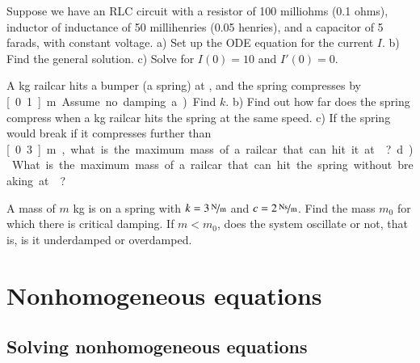 \begin{exercise}
Suppose we have an RLC circuit with a resistor of 100 milliohms (0.1 ohms),
inductor of inductance of 50 millihenries (0.05 henries), and a capacitor of 5 farads, with
constant voltage.  a) Set up the ODE equation for the current $I$. b) Find
the general solution.  c) Solve for $I(0) = 10$ and $I'(0) = 0$.
\end{exercise}

\begin{exercise}
A \unit[5000]{kg} railcar hits a bumper (a spring) at ,
and the spring compresses by \unit[0.1]{m}.  Assume no damping.
a) Find $k$. b) Find out how far does the spring compress when a
\unit[10000]{kg} railcar hits the spring at the same speed. c) If the spring
would break if it compresses further than \unit[0.3]{m}, what is the maximum
mass of a railcar that can hit it at ? d) What is
the maximum mass of a railcar that can hit the spring without breaking
at ?
\end{exercise}

\begin{exercise}
A mass of $m$ \unit{kg} is on a spring with $k=\unitfrac[3]{N}{m}$ and
$c=\unitfrac[2]{Ns}{m}$.  Find the mass $m_0$ for which there is critical
damping.  If $m < m_0$, does the system oscillate or not, that is, is it
underdamped or overdamped.
\end{exercise}


\sectionnewpage
\section{Nonhomogeneous equations}
\label{sec:nonhom}


\subsection{Solving nonhomogeneous equations}

